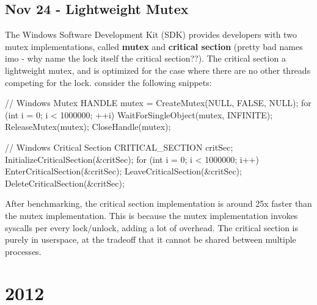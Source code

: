 \documentclass[11pt, a4paper]{article}
\theoremstyle{definition}
\theoremstyle{remark}
\begin{document}
\subsection{Nov 24 - Lightweight Mutex} 
The Windows Software Development Kit (SDK) provides developers with two mutex implementations, called \textbf{mutex} and \textbf{critical section} (pretty bad names imo - why name the lock itself the critical section??). The critical section a lightweight mutex, and is optimized for
the case where there are no other threads competing for the lock. consider the following snippets:

\begin{ccode}
// Windows Mutex
HANDLE mutex = CreateMutex(NULL, FALSE, NULL);
for (int i = 0; i < 1000000; ++i) {
  WaitForSingleObject(mutex, INFINITE);
  ReleaseMutex(mutex);
}
CloseHandle(mutex);
\end{ccode}
\begin{ccode}
// Windows Critical Section
CRITICAL_SECTION critSec;
InitializeCriticalSection(&critSec);
for (int i = 0; i < 1000000; i++){
    EnterCriticalSection(&critSec);
    LeaveCriticalSection(&critSec);
}    
DeleteCriticalSection(&critSec);
\end{ccode}
After benchmarking, the critical section implementation is around 25x faster than the mutex implementation. This is because the mutex implementation invokes syscalls per every lock/unlock, adding a lot of overhead.
The critical section is purely in userspace, at the tradeoff that it cannot be shared between multiple processes. 

\section{2012}
\end{document}
